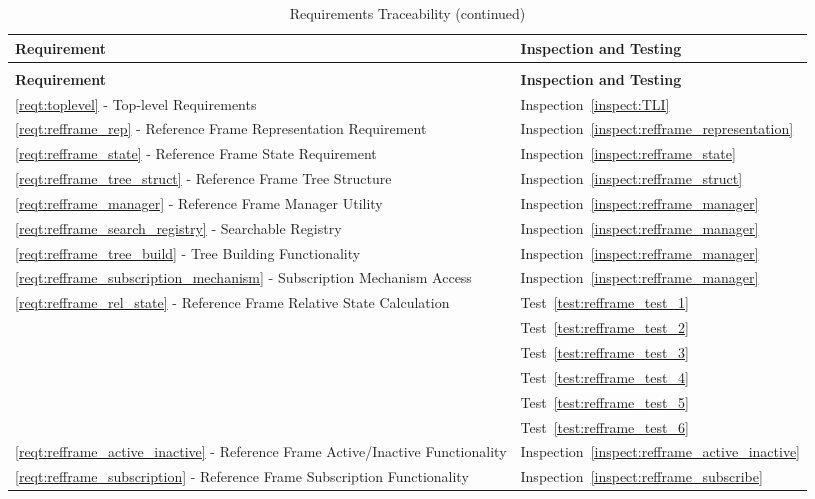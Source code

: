 \begin{longtable}[c]{||p{3in}|p{3in}|}
\caption{Requirements Traceability} \\[6pt]
\hline
{\bf Requirement} & {\bf Inspection and Testing} \\
\hline \hline
\endfirsthead
\hline
\endfoot
\caption[]{Requirements Traceability (continued)} \\[6pt]
\hline
{\bf Requirement} & {\bf Inspection and Testing} \\
\hline \hline
\endhead

\ref{reqt:toplevel} - Top-level Requirements &
  Inspection~\ref{inspect:TLI} \\
  \hline

\ref{reqt:refframe_rep} - Reference Frame Representation Requirement &
   Inspection~\ref{inspect:refframe_representation} \\
\hline

\ref{reqt:refframe_state} - Reference Frame State Requirement &
   Inspection~\ref{inspect:refframe_state} \\
\hline

\ref{reqt:refframe_tree_struct} - Reference Frame Tree Structure &
   Inspection~\ref{inspect:refframe_struct} \\
\hline

\ref{reqt:refframe_manager} - Reference Frame Manager Utility &
   Inspection~\ref{inspect:refframe_manager} \\
\hline
\ref{reqt:refframe_search_registry} - Searchable Registry &
   Inspection~\ref{inspect:refframe_manager} \\
\hline
\ref{reqt:refframe_tree_build} - Tree Building Functionality &
   Inspection~\ref{inspect:refframe_manager} \\
\hline
\ref{reqt:refframe_subscription_mechanism} - Subscription Mechanism Access &
   Inspection~\ref{inspect:refframe_manager} \\
\hline

\ref{reqt:refframe_rel_state} - Reference Frame Relative State Calculation &

   Test~\ref{test:refframe_test_1} \\
   &Test~\ref{test:refframe_test_2} \\
   &Test~\ref{test:refframe_test_3} \\
   &Test~\ref{test:refframe_test_4} \\
   &Test~\ref{test:refframe_test_5} \\
   &Test~\ref{test:refframe_test_6} \\
\hline

\ref{reqt:refframe_active_inactive} - Reference Frame Active/Inactive Functionality &

   Inspection~\ref{inspect:refframe_active_inactive} \\
\hline

\ref{reqt:refframe_subscription} - Reference Frame Subscription Functionality &

   Inspection~\ref{inspect:refframe_subscribe} \\
\hline

\end{longtable}
